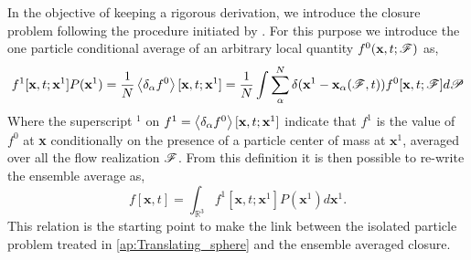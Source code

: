 In the objective of keeping a rigorous derivation, we introduce the closure problem following the procedure initiated by \citet{hinch1977averaged}. 
For this purpose we introduce the one particle conditional average of an arbitrary local quantity $f^0(\textbf{x},t;\mathscr{F})$ as, 
\begin{equation*}
    f^1[\textbf{x},t;\textbf{x}^1] P(\textbf{x}^1)
    =
    \frac{1}{N} 
    \left<\delta_\alpha f^0\right>[\textbf{x},t;\textbf{x}^1]
    = 
    \frac{1}{N}
    \int 
    \sum_\alpha^N \delta(\textbf{x}^1 - \textbf{x}_\alpha(\mathscr{F},t))
    f^0[\textbf{x},t;\mathscr{F}]
    d\mathscr{P}
\end{equation*}
Where the superscript $^1$ on $f^1 = \left<\delta_\alpha f^0\right>[\textbf{x},t;\textbf{x}^1]$ indicate that $f^1$ is the value of $f^0$ at \textbf{x} conditionally on the presence of a particle center of mass at $\textbf{x}^1$, averaged over all the flow realization $\mathscr{F}$. 
From this definition it is then possible to re-write the ensemble average as, 
\begin{equation}
    f[\textbf{x},t]
    = \int_{\mathbb{R}^3}
    f^1[\textbf{x},t;\textbf{x}^1]
    P(\textbf{x}^1) d\textbf{x}^1. 
    \label{eq:avg_cond_1}
\end{equation}
This relation is the starting point to make the link between the isolated particle problem treated in \ref{ap:Translating_sphere} and the ensemble averaged closure. 


